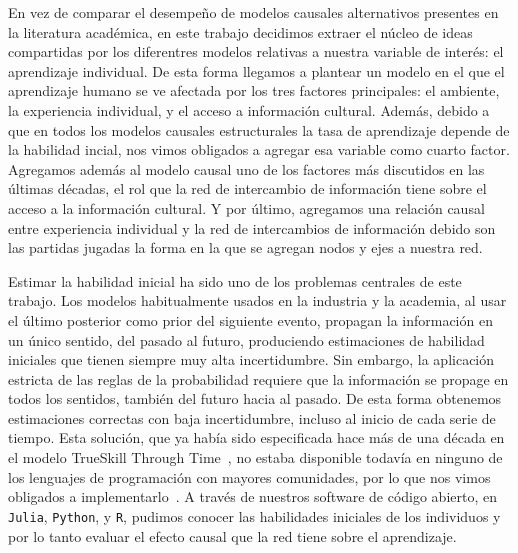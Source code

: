 \documentclass[a4paper,11pt]{book}
\theoremstyle{definition}
\begin{document}
En vez de comparar el desempeño de modelos causales alternativos presentes en la literatura académica, en este trabajo decidimos extraer el núcleo de ideas compartidas por los diferentres modelos relativas a nuestra variable de interés: el aprendizaje individual.
%
De esta forma llegamos a plantear un modelo en el que el aprendizaje humano se ve afectada por los tres factores principales: el ambiente, la experiencia individual, y el acceso a información cultural.
%
Además, debido a que en todos los modelos causales estructurales la tasa de aprendizaje depende de la habilidad incial, nos vimos obligados a agregar esa variable como cuarto factor.
%
Agregamos además al modelo causal uno de los factores más discutidos en las últimas décadas, el rol que la red de intercambio de información tiene sobre el acceso a la información cultural.
%
Y por último, agregamos una relación causal entre experiencia individual y la red de intercambios de información debido son las partidas jugadas la forma en la que se agregan nodos y ejes a nuestra red.

Estimar la habilidad inicial ha sido uno de los problemas centrales de este trabajo.
%
Los modelos habitualmente usados en la industria y la academia, al usar el último posterior como prior del siguiente evento, propagan la información en un único sentido, del pasado al futuro, produciendo estimaciones de habilidad iniciales que tienen siempre muy alta incertidumbre.
%
Sin embargo, la aplicación estricta de las reglas de la probabilidad requiere que la información se propage en todos los sentidos, también del futuro hacia al pasado.
%
De esta forma obtenemos estimaciones correctas con baja incertidumbre, incluso al inicio de cada serie de tiempo.
%
Esta solución, que ya había sido especificada hace más de una década en el modelo TrueSkill Through Time~\cite{Dangauthier2007}, no estaba disponible todavía en ninguno de los lenguajes de programación con mayores comunidades, por lo que nos vimos obligados a implementarlo~\cite{Landfried2021-TTT}.
%
A través de nuestros software de código abierto, en \texttt{Julia}, \texttt{Python}, y \texttt{R}, pudimos conocer las habilidades iniciales de los individuos y por lo tanto evaluar el efecto causal que la red tiene sobre el aprendizaje.
\end{document}
